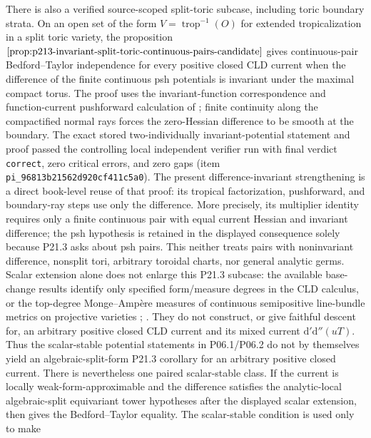 There is also a verified source-scoped split-toric subcase, including toric
boundary strata.  On an open set of the form
\(V=\operatorname{trop}^{-1}(O)\) for extended tropicalization in a split
toric variety, the
proposition
\(\cref{prop:p213-invariant-split-toric-continuous-pairs-candidate}\) gives
continuous-pair Bedford--Taylor independence for every positive closed CLD
current when the difference of the finite continuous psh potentials is
invariant under the maximal compact torus.  The proof uses the
invariant-function correspondence and function-current pushforward
calculation of \cite[(5.5) and Proposition~5.3.10(iv)]{BGJKK25}; finite
continuity along the compactified normal rays forces the zero-Hessian
difference to be smooth at the boundary.  The exact stored two-individually
invariant-potential statement and proof passed the controlling local
independent verifier run with final verdict \texttt{correct}, zero critical
errors, and zero gaps (item \texttt{pi\_96813b21562d920cf411c5a0}).  The
present difference-invariant strengthening is a direct book-level reuse of
that proof: its tropical factorization, pushforward, and boundary-ray steps
use only the difference.  More precisely, its multiplier identity requires
only a finite continuous pair with equal current Hessian and invariant
difference; the psh hypothesis is retained in the displayed consequence
solely because P21.3 asks about psh pairs.  This neither treats pairs with noninvariant
difference, nonsplit tori, arbitrary toroidal charts, nor general analytic
germs.  Scalar extension alone does not enlarge this P21.3 subcase:
the available base-change results identify only specified form/measure degrees
in the CLD calculus, or the top-degree Monge--Amp\`ere measures of continuous
semipositive line-bundle metrics on projective varieties
\cite[Propositions~15.3.1--15.3.2]{CLD25};
\cite[Proposition~8.4.2]{BGJKK25}.
They do not construct, or give faithful descent for, an arbitrary positive
closed CLD current and its mixed current
\(\mathrm d'\mathrm d''(uT)\).  Thus the scalar-stable potential statements
in P06.1/P06.2 do not by themselves yield an algebraic-split-form P21.3
corollary for an arbitrary positive closed current.  There is nevertheless
one paired scalar-stable class.  If the current is locally
weak-form-approximable and the difference satisfies the analytic-local
algebraic-split equivariant tower hypotheses after the displayed scalar extension, then
 gives the
Bedford--Taylor equality.  The scalar-stable condition is used only to make
